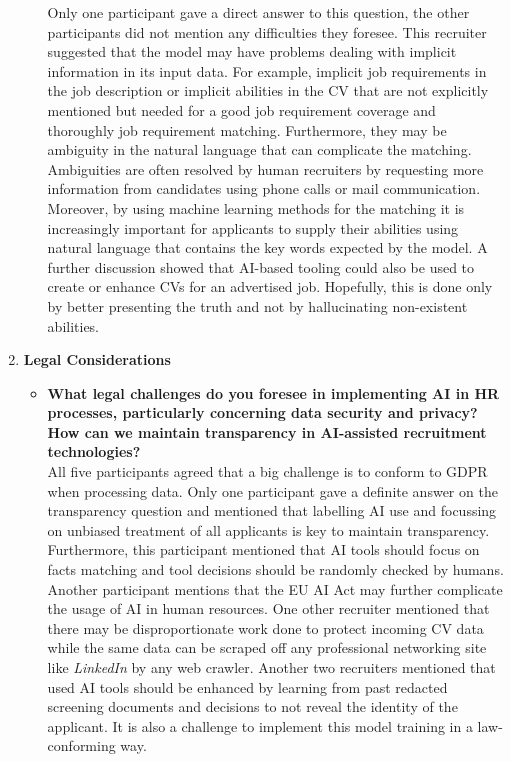 \documentclass[draft,final]{thesisclass} %
\begin{document}
\begin{enumerate}
\begin{itemize}
        Only one participant gave a direct answer to this question, the other participants did not mention any difficulties they foresee.
        This recruiter suggested that the model may have problems dealing with implicit information in its input data. For example, implicit job requirements in the job description or implicit abilities in the \acs{CV} that are not explicitly mentioned but needed for a good job requirement coverage and thoroughly job requirement matching. Furthermore, they may be ambiguity in the natural language that can complicate the matching. 
        Ambiguities are often resolved by human recruiters by requesting more information from candidates using phone calls or mail communication.
        Moreover, by using machine learning methods for the matching it is increasingly important for applicants to supply their abilities using natural language that contains the key words expected by the model. A further discussion showed that \acs{AI}-based tooling could also be used to create or enhance \acs{CV}s for an advertised job.
        Hopefully, this is done only by better presenting the truth and not by hallucinating non-existent abilities.
    \end{itemize}
    \item \textbf{Legal Considerations}
    \begin{itemize}
        \item \textbf{What legal challenges do you foresee in implementing \acs{AI} in \acs{HR} processes, particularly concerning data security and privacy? How can we maintain transparency in \acs{AI}-assisted recruitment technologies?}\\
        All five participants agreed that a big challenge is to conform to \acs{GDPR} when processing data. Only one participant gave a definite answer on the transparency question and mentioned that labelling \acs{AI} use and focussing on unbiased treatment of all applicants is key to maintain transparency. Furthermore, this participant mentioned that \acs{AI} tools should focus on facts matching and tool decisions should be randomly checked by humans. Another participant mentions that the \acs{EU AI Act} may further complicate the usage of \acs{AI} in human resources. One other recruiter mentioned that there may be disproportionate work done to protect incoming \acs{CV} data while the same data can be scraped off any professional networking site like \textit{LinkedIn} by any web crawler.
        Another two recruiters mentioned that used \acs{AI} tools should be enhanced by learning from past redacted screening documents and decisions to not reveal the identity of the applicant. It is also a challenge to implement this model training in a law-conforming way.

\end{itemize}
\end{enumerate}
\end{document}
